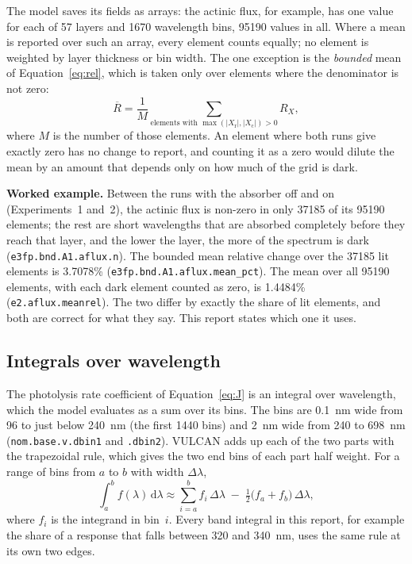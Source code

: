 The model saves its fields as arrays: the actinic flux, for example, has one value for
each of 57 layers and 1670 wavelength bins, 95190 values in all. Where a mean is
reported over such an array, every element counts equally; no element is weighted by
layer thickness or bin width. The one exception is the \emph{bounded} mean of
Equation~\eqref{eq:rel}, which is taken only over elements where the denominator is not
zero:
\begin{equation}
  \overline{R} = \frac{1}{M} \sum_{\text{elements with } \max(|X_{\mathrm{r}}|,|X_{\mathrm{c}}|) > 0} R_X ,
  \label{eq:boundedmean}
\end{equation}
where $M$ is the number of those elements. An element where both runs give exactly zero
has no change to report, and counting it as a zero would dilute the mean by an amount
that depends only on how much of the grid is dark.

\textbf{Worked example.} Between the runs with the absorber off and on (Experiments~1
and~2), the actinic flux is non-zero in only 37185 of its 95190 elements; the rest are
short wavelengths that are absorbed completely before they reach that layer, and the
lower the layer, the more of the spectrum is dark (\texttt{e3fp.bnd.A1.aflux.n}). The bounded mean relative change over the 37185 lit
elements is 3.7078\% (\texttt{e3fp.bnd.A1.aflux.mean\_pct}). The mean over all 95190
elements, with each dark element counted as zero, is 1.4484\%
(\texttt{e2.aflux.meanrel}). The two differ by exactly the share of lit elements, and
both are correct for what they say. This report states which one it uses.

\subsection{Integrals over wavelength}
\label{sec:conv-quad}

The photolysis rate coefficient of Equation~\eqref{eq:J} is an integral over
wavelength, which the model evaluates as a sum over its bins. The bins are 0.1~nm wide
from 96 to just below 240~nm (the first 1440 bins) and 2~nm wide from 240 to 698~nm
(\texttt{nom.base.v.dbin1} and \texttt{.dbin2}). VULCAN adds up each of the two parts
with the trapezoidal rule, which gives the two end bins of each part half weight. For a
range of bins from $a$ to $b$ with width $\Delta\lambda$,
\begin{equation}
  \int_{a}^{b} f(\lambda)\,\mathrm{d}\lambda \approx
  \sum_{i=a}^{b} f_i\,\Delta\lambda \;-\; \tfrac{1}{2}\big(f_a + f_b\big)\,\Delta\lambda ,
  \label{eq:quad}
\end{equation}
where $f_i$ is the integrand in bin~$i$. Every band integral in this report, for
example the share of a response that falls between 320 and 340~nm, uses the same rule
at its own two edges.

